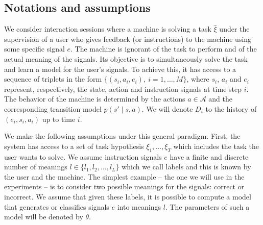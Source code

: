 \subsection{Notations and assumptions}

We consider interaction sessions where a machine is solving a task $\hat{\xi}$ under the supervision of a user who gives feedback (or instructions) to the machine using some specific signal $e$. The machine is ignorant of the task to perform and of the actual meaning of the signals. Its objective is to simultaneously solve the task and learn a model for the user's signals. To achieve this, it has access to a sequence of triplets in the form $\{(s_i, a_i, e_i),\ i = 1,\ldots,M\}$, where $s_i$, $a_i$ and $e_i$ represent, respectively, the state, action and instruction signals at time step $i$. The behavior of the machine is determined by the actions $a\in\mathcal{A}$ and the corresponding transition model $p(s'\mid s,a)$.  We will denote $D_i$ to the history of $(e_i, s_i, a_i)$ up to time $i$.


We make the following assumptions under this general paradigm. First, the system has access to a set of task hypothesis $\xi_1,\ldots,\xi_T$ which includes the task the user wants to solve. We assume instruction signals $e$ have a finite and discrete number of meanings $l \in \{l_1, l_2, \ldots, l_L\}$ which we call labels and this is known by the user and the machine. The simplest example -- the one we will use in the experiments -- is to consider two  possible meanings for the signals: correct or incorrect. We assume that given these labels, it is possible to compute a model that generates or classifies signals $e$ into meanings $l$. The parameters of such a model will be denoted by $\theta$.


 




